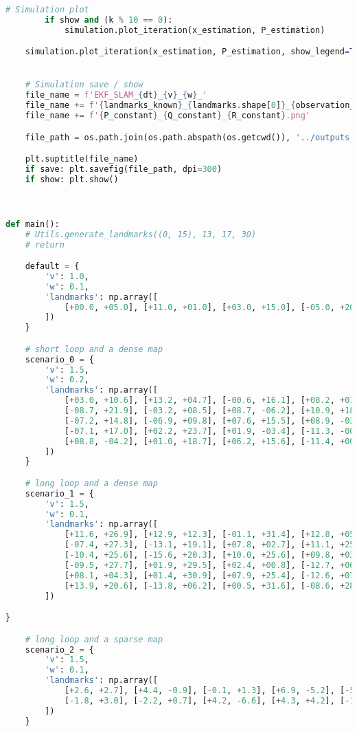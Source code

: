 \documentclass[../CSC_5RO12_TA_TP4.tex]{subfiles}
\begin{document}
\begin{scriptsize}
\begin{lstlisting}[language=Python]
        # Simulation plot
        if show and (k % 10 == 0):
            simulation.plot_iteration(x_estimation, P_estimation)

    simulation.plot_iteration(x_estimation, P_estimation, show_legend=True)


    # Simulation save / show
    file_name = f'EKF_SLAM_{dt}_{v}_{w}_'
    file_name += f'{landmarks_known}_{landmarks.shape[0]}_{observation_range}_'
    file_name += f'{P_constant}_{Q_constant}_{R_constant}.png'

    file_path = os.path.join(os.path.abspath(os.getcwd()), '../outputs', file_name)

    plt.suptitle(file_name)
    if save: plt.savefig(file_path, dpi=300)
    if show: plt.show()



def main():
    # Utils.generate_landmarks((0, 15), 13, 17, 30)
    # return

    default = {
        'v': 1.0,
        'w': 0.1,
        'landmarks': np.array([
            [+00.0, +05.0], [+11.0, +01.0], [+03.0, +15.0], [-05.0, +20.0]
        ])
    }

    # short loop and a dense map
    scenario_0 = {
        'v': 1.5,
        'w': 0.2,
        'landmarks': np.array([
            [+03.0, +10.6], [+13.2, +04.7], [-00.6, +16.1], [+08.2, +01.4], [-12.4, +19.6],
            [-08.7, +21.9], [-03.2, +08.5], [+08.7, -06.2], [+10.9, +18.1], [-10.7, +04.5],
            [-07.2, +14.8], [-06.9, +09.8], [+07.6, +15.5], [+08.9, -03.3], [+03.9, -00.8],
            [-07.1, +17.0], [+02.2, +23.7], [+01.9, -03.4], [-11.3, -00.2], [+03.9, +12.1],
            [+08.8, -04.2], [+01.0, +18.7], [+06.2, +15.6], [-11.4, +00.3], [-07.0, +04.0],
        ])
    }

    # long loop and a dense map
    scenario_1 = {
        'v': 1.5,
        'w': 0.1,
        'landmarks': np.array([
            [+11.6, +26.9], [+12.9, +12.3], [-01.1, +31.4], [+12.8, +05.4], [-10.5, +25.2],
            [-07.4, +27.3], [-13.1, +19.1], [+07.8, +02.7], [+11.1, +25.9], [-13.6, +11.2],
            [-10.4, +25.6], [-15.6, +20.3], [+10.0, +25.6], [+09.8, +03.1], [+05.8, +02.8],
            [-09.5, +27.7], [+01.9, +29.5], [+02.4, +00.8], [-12.7, +06.4], [+09.0, +25.5],
            [+08.1, +04.3], [+01.4, +30.9], [+07.9, +25.4], [-12.6, +07.0], [-12.0, +09.0],
            [+13.9, +20.6], [-13.8, +06.2], [+00.5, +31.6], [-08.6, +28.4], [+16.0, +13.5],
        ])

}

    # long loop and a sparse map
    scenario_2 = {
        'v': 1.5,
        'w': 0.1,
        'landmarks': np.array([
            [+2.6, +2.7], [+4.4, -0.9], [-0.1, +1.3], [+6.9, -5.2], [-5.9, +5.7],
            [-1.8, +3.0], [-2.2, +0.7], [+4.2, -6.6], [+4.3, +4.2], [-1.3, -0.4], 
        ])
    }


\end{lstlisting}
\end{scriptsize}
\end{document}

